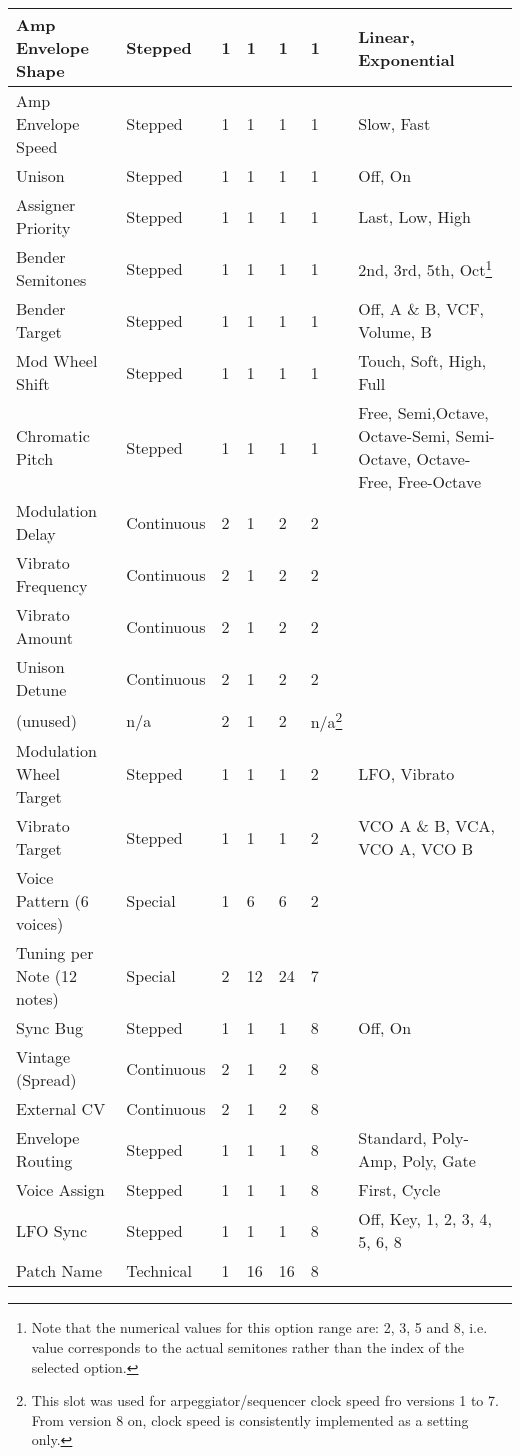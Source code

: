\begin{longtable}[l]{p{5cm}|p{2cm}|p{1.5cm}|p{1.5cm}|p{2cm}|p{2.2cm}|p{5cm}}
Amp Envelope Shape & Stepped & 1 & 1 & 1 & 1 & Linear, Exponential \\ \hline
Amp Envelope Speed & Stepped & 1 & 1 & 1 & 1 & Slow, Fast \\ \hline
Unison & Stepped & 1 & 1 & 1 & 1 & Off, On \\ \hline
Assigner Priority & Stepped & 1 & 1 & 1 & 1 & Last, Low, High \\ \hline
Bender Semitones & Stepped & 1 & 1 & 1 & 1 & 2nd, 3rd, 5th, Oct\footnote{Note that the numerical values for this option range are: 2, 3, 5 and 8, i.e. value corresponds to the actual semitones rather than the index of the selected option.} \\ \hline
Bender Target & Stepped & 1 & 1 & 1 & 1 & Off, A \& B, VCF, Volume, B \\ \hline
Mod Wheel Shift & Stepped & 1 & 1 & 1 & 1 & Touch, Soft, High, Full \\ \hline
Chromatic Pitch & Stepped & 1 & 1 & 1 & 1 & Free, Semi,Octave, Octave-Semi, Semi-Octave, Octave-Free, Free-Octave \\ \hline
Modulation Delay & Continuous & 2 & 1 & 2 & 2 &  \\ \hline
Vibrato Frequency & Continuous & 2 & 1 & 2 & 2 &  \\ \hline
Vibrato Amount & Continuous & 2 & 1 & 2 & 2 &  \\ \hline
Unison Detune & Continuous & 2 & 1 & 2 & 2 &  \\ \hline
(unused) & n/a & 2 & 1 & 2 & n/a\footnote{This slot was used for arpeggiator/sequencer clock speed fro versions 1 to 7. From version 8 on, clock speed is consistently implemented as a setting only.} &  \\ \hline
Modulation Wheel Target & Stepped & 1 & 1 & 1 & 2 & LFO, Vibrato \\ \hline
Vibrato Target & Stepped & 1 & 1 & 1 & 2 & VCO A \& B, VCA, VCO A, VCO B \\ \hline
Voice Pattern (6 voices) & Special & 1 & 6 & 6 & 2 &  \\ \hline
Tuning per Note (12 notes) & Special & 2 & 12 & 24 & 7 &  \\ \hline
Sync Bug & Stepped & 1 & 1 & 1 & 8 & Off, On \\ \hline
Vintage (Spread) & Continuous & 2 & 1 & 2 & 8 &  \\ \hline
External CV & Continuous & 2 & 1 & 2 & 8 &  \\ \hline
Envelope Routing & Stepped & 1 & 1 & 1 & 8 & Standard, Poly-Amp, Poly, Gate \\ \hline
Voice Assign & Stepped & 1 & 1 & 1 & 8 & First, Cycle \\ \hline
LFO Sync & Stepped & 1 & 1 & 1 & 8 & Off, Key, 1, 2, 3, 4, 5, 6, 8 \\ \hline
Patch Name & Technical & 1 & 16 & 16 & 8 &  \\ \hline




\end{longtable}


